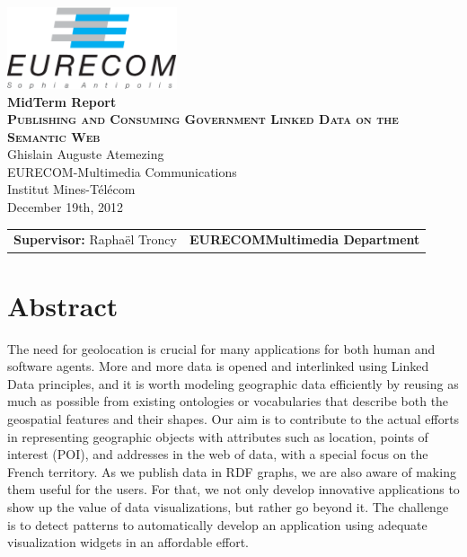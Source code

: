 \documentclass[a4paper,11pt]{report}
\begin{document}
\begin{titlepage}
\begin{center}
\includegraphics[width=5cm]{EURECOM_logo_quadri}
\\[3cm]
\textbf{\Huge{MidTerm Report}}
\\[4cm]
\textbf{\textsc{\LARGE{Publishing and Consuming Government Linked Data on the Semantic Web}}}
\\[0.5cm]
\LARGE{Ghislain Auguste Atemezing}
\\[0.5cm]
\small{EURECOM-Multimedia Communications}
\\
\large{Institut Mines-T\'{e}l\'{e}com}
\\
\large{December 19th, 2012}
\\[5cm]
\begin{tabular}{p{8cm} p{8.5cm}}
\small{\textbf{Supervisor:}\newline
Rapha\"el Troncy} 
&
\small{\textbf{EURECOM\newline Multimedia Department}}
\end{tabular}
\end{center}
\end{titlepage}

 \tableofcontents


\chapter*{Abstract}

The need for geolocation is crucial for many applications for both human and software agents. More and more data is opened and interlinked using Linked Data principles, and it is worth modeling geographic data efficiently by reusing as much as possible from existing ontologies or vocabularies that describe both the geospatial features and their shapes. Our aim is to contribute to the actual efforts in representing geographic objects with attributes such as location, points of interest (POI), and addresses in the web of data, with a special focus on the French territory.
As we publish data in RDF graphs, we are also aware of making them useful for the users. For that, we not only develop innovative applications to show up the value of data visualizations, but rather go beyond it. The challenge is to detect patterns to automatically develop an application using adequate visualization widgets in an affordable effort.  
\end{document}
